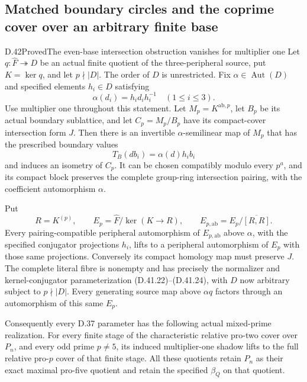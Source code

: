 \subsection{Matched boundary circles and the coprime cover over an arbitrary finite base}

\begin{statement}{D.42}{Proved}{The even-base intersection obstruction vanishes for multiplier one}
Let \(q:\widehat F\twoheadrightarrow D\) be an actual finite
quotient of the three-peripheral source, put \(K=\ker q\),
and let \(p\nmid |D|\).
The order of \(D\) is unrestricted.
Fix \(\alpha\in\operatorname{Aut}(D)\) and specified elements
\(h_i\in D\) satisfying
\[
             \alpha(d_i)=h_i d_i h_i^{-1}\quad(1\leq i\leq3).
 \tag{D.42.1}
\]
Use multiplier one throughout this statement.
Let \(M_p=K^{\mathrm{ab},p}\), let \(B_p\) be its actual
boundary sublattice, and let \(C_p=M_p/B_p\) have its
compact-cover intersection form \(J\).
Then there is an invertible \(\alpha\)-semilinear map of
\(M_p\) that has the prescribed boundary values
\[
 T_B(d b_i)=\alpha(d)h_i b_i
 \tag{D.42.2}
\]
and induces an isometry of \(C_p\).
It can be chosen compatibly modulo every \(p^a\), and
its compact block preserves the complete group-ring
intersection pairing, with the coefficient automorphism
\(\alpha\).

Put
\[
 R=K^{(p)},\qquad
 E_p=\widehat F/\ker(K\longrightarrow R),\qquad
 E_{p,\mathrm{ab}}=E_p/\overline{[R,R]}.
 \tag{D.42.3}
\]
Every pairing-compatible peripheral automorphism of
\(E_{p,\mathrm{ab}}\) above \(\alpha\), with the specified
conjugator projections \(h_i\), lifts to a peripheral
automorphism of \(E_p\) with those same projections.
Conversely its compact homology map must preserve \(J\).
The complete literal fibre is nonempty and has precisely
the normalizer and kernel-conjugator parameterization
\textup{(D.41.22)--(D.41.24)}, with \(D\) now arbitrary
subject to \(p\nmid|D|\).
Every generating source map above \(\alpha q\) factors
through an automorphism of this same \(E_p\).

Consequently every D.37 parameter has the following
actual mixed-prime realization.
For every finite stage of the characteristic relative
pro-two cover over \(P_n\), and every odd prime
\(p\ne5\), its induced multiplier-one shadow lifts to
the full relative pro-\(p\) cover of that finite stage.
All these quotients retain \(P_n\) as their exact maximal
pro-five quotient and retain the specified \(\beta_Q\)
on that quotient.
\end{statement}

